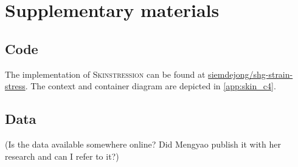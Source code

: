 \chapter{Supplementary materials}
\section{Code}
The implementation of \textsc{Skinstression} can be found at \href{https://github.io/siemdejong/shg-strain-stress}{ siemdejong/shg-strain-stress}.
The context and container diagram are depicted in \cref{app:skin_c4}.

\section{Data}
 (Is the data available somewhere online?
 Did Mengyao publish it with her research and can I refer to it?)